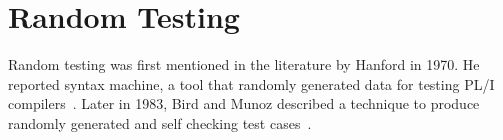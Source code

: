 





\section{Random Testing}
Random testing was first mentioned in the literature by Hanford in 1970. He reported syntax machine, a tool that randomly generated data for testing PL/I compilers~\cite{hanford1970automatic}. Later in 1983, Bird and Munoz described a technique to produce randomly generated and self checking test cases~\cite{bird1983automatic}. 

